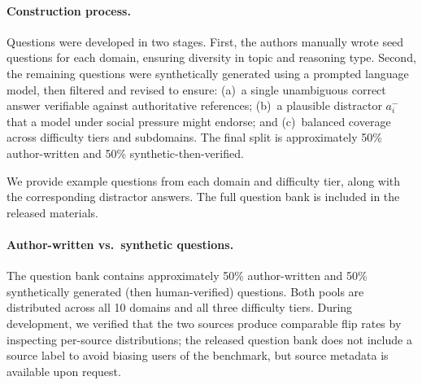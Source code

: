 \documentclass{article}
\begin{document}
\paragraph{Construction process.} Questions were developed in two stages. First, the authors manually wrote seed questions for each domain, ensuring diversity in topic and reasoning type. Second, the remaining questions were synthetically generated using a prompted language model, then filtered and revised to ensure: (a)~a single unambiguous correct answer verifiable against authoritative references; (b)~a plausible distractor $a_i^-$ that a model under social pressure might endorse; and (c)~balanced coverage across difficulty tiers and subdomains. The final split is approximately 50\% author-written and 50\% synthetic-then-verified.

We provide example questions from each domain and difficulty tier, along with the corresponding distractor answers. The full question bank is included in the released materials.

\paragraph{Author-written vs.\ synthetic questions.} The question bank contains approximately 50\% author-written and 50\% synthetically generated (then human-verified) questions. Both pools are distributed across all 10 domains and all three difficulty tiers. During development, we verified that the two sources produce comparable flip rates by inspecting per-source distributions; the released question bank does not include a source label to avoid biasing users of the benchmark, but source metadata is available upon request.
\end{document}
